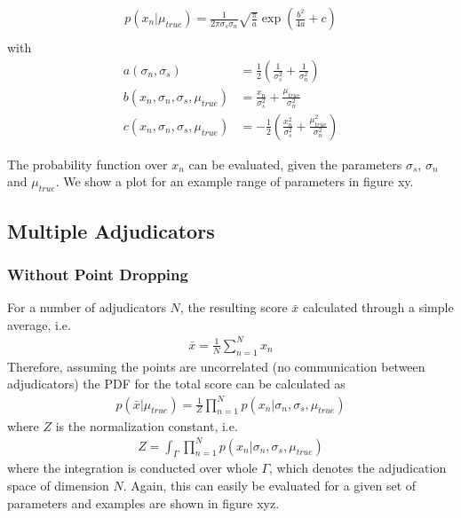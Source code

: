 \documentclass[%
 reprint,
 amsmath,amssymb,
 aps,
]{revtex4-1}
\begin{document}
\begin{align}
p(x_n|\mu_{true}) =\frac{1}{2\pi\sigma_s\sigma_n} \sqrt{\frac{\pi}{a}}\exp\left(\frac{b^2}{4a}+c\right)\\
\end{align}
with
\begin{align}
a(\sigma_n, \sigma_s) &= \frac{1}{2}\left(\frac{1}{\sigma_s^2} + \frac{1}{\sigma_n^2}\right)\\
b(x_n, \sigma_n, \sigma_s, \mu_{true}) &= \frac{x_n}{\sigma_s^2} + \frac{\mu_{true}}{\sigma_n^2}\\
c(x_n, \sigma_n, \sigma_s, \mu_{true}) &= -\frac{1}{2}\left(\frac{x_n^2}{\sigma_s^2} + \frac{\mu_{true}^2}{\sigma_n^2}\right)
\end{align}

The probability function over $x_n$ can be evaluated, given the parameters $\sigma_s$, $\sigma_n$ and $\mu_{true}$. We show a plot for an example range of parameters in figure xy.\\

\subsection{Multiple Adjudicators}




\subsubsection{Without Point Dropping}
For a number of adjudicators $N$, the resulting score $\bar{x}$ calculated through a simple average, i.e.
\begin{align}
\bar{x} = \frac{1}{N}\sum_{n=1}^{N} x_n
\end{align}
Therefore, assuming the points are uncorrelated (no communication between adjudicators) the PDF for the total score can be calculated as
\begin{align}
p(\bar{x}|\mu_{true}) = \frac{1}{Z}\prod_{n=1}^{N}p(x_n|\sigma_n, \sigma_s, \mu_{true})
\end{align}
where $Z$ is the normalization constant, i.e.
\begin{align}
Z = \int_\Gamma \prod_{n=1}^{N}p(x_n|\sigma_n, \sigma_s, \mu_{true})
\end{align}
where the integration is conducted over whole $\Gamma$, which denotes the adjudication space of dimension $N$. Again, this can easily be evaluated for a given set of parameters and examples are shown in figure xyz. \\
\end{document}
